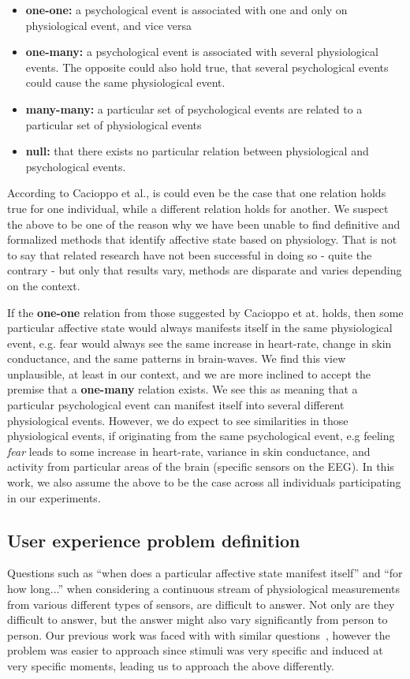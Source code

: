 \begin{itemize}[noitemsep, nolistsep]
\item \textbf{one-one:} a psychological event is associated with one and only on physiological event, and vice versa
\item \textbf{one-many:} a psychological event is associated with several physiological events. The opposite could also
  hold true, that several psychological events could cause the same physiological event.
\item \textbf{many-many:} a particular set of psychological events are related to a particular set of physiological
  events
\item \textbf{null:} that there exists no particular relation between physiological and psychological events.
\end{itemize}

According to Cacioppo et al., is could even be the case that one relation holds true for one individual, while a
different relation holds for another. We suspect the above to be one of the reason why we have been unable to find
definitive and formalized methods that identify affective state based on physiology. That is not to say that related
research have not been successful in doing so - quite the contrary - but only that results vary, methods are disparate
and varies depending on the context.

If the \textbf{one-one} relation from those suggested by Cacioppo et at. holds, then some particular affective state
would always manifests itself in the same physiological event, e.g. fear would always see the same increase in
heart-rate, change in skin conductance, and the same patterns in brain-waves. We find this view unplausible, at least in
our context, and we are more inclined to accept the premise that a \textbf{one-many} relation exists. We see this as
meaning that a particular psychological event can manifest itself into several different physiological events. However,
we do expect to see similarities in those physiological events, if originating from the same psychological event, e.g
feeling \textit{fear} leads to some increase in heart-rate, variance in skin conductance, and activity from particular
areas of the brain (specific sensors on the EEG). In this work, we also assume the above to be the case across all
individuals participating in our experiments.

\subsection{User experience problem definition}
Questions such as ``when does a particular affective state manifest itself'' and ``for how long...'' when considering a
continuous stream of physiological measurements from various different types of sensors, are difficult to answer. Not
only are they difficult to answer, but the answer might also vary significantly from person to person. Our previous work
was faced with with similar questions~\cite{9th_semester_project}, however the problem was easier to approach since
stimuli was very specific and induced at very specific moments, leading us to approach the above differently.

